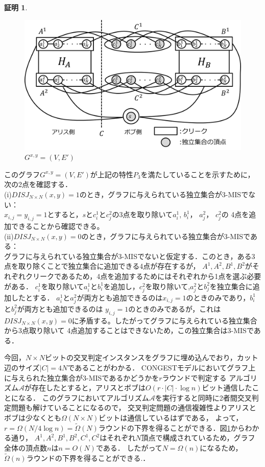 \documentclass[12pt]{thesis}
\newcommand{\CONGEST}{\textsf{CONGEST}}
\theoremstyle{definition}
\newtheorem*{prf*}{証明}
\begin{document}
\begin{prf*}
\begin{figure}[ht]
\begin{center}
\includegraphics[width=120mm]{3_Gxy.png}
\end{center}
\caption{$G^{x, y} = (V, E')$}
\label{3_G(x,y)}
\end{figure}

このグラフ$G^{x, y} = (V, E')$が上記の特性$P_{3}$を満たしていることを示すために，次の2点を確認する． \\
(i)$DISJ_{N \times N} (x, y) = 1$のとき，グラフに与えられている独立集合が3-MISでない： \\
$x_{i, j} = y_{i, j} =1$とすると，$s$と$c_{i}^{1}$と$c_{j}^{2}$の3点を取り除いて$a_{i}^{1}$, $b_{i}^{1}$， $a_{j}^{2}$， $c_{j}^{2}$の
4点を追加できることから確認できる。 \\
(ii)$DISJ_{N \times N} (x, y) = 0$のとき，グラフに与えられている独立集合が3-MISである： \\ 
グラフに与えられている独立集合が3-MISでないと仮定する．このとき，ある3点を取り除くことで独立集合に追加できる4点が存在するが，
$A^{1}, A^{2}, B^{1}, B^{2}$がそれぞれクリークであるため，4点を追加するためにはそれぞれから1点を選ぶ必要がある．
$c_{i}^{1}$を取り除いて$a_{i}^{1}$と$b_{i}^{1}$を追加し，$c_{j}^{2}$を取り除いて,$a_{j}^{2}$と$b_{j}^{2}$を独立集合に追加したとする．
$a_{i}^{1}$と$a_{j}^{2}$が両方とも追加できるのは$x_{i, j} = 1$のときのみであり，$b_{i}^{1}$と$b_{j}^{2}$が両方とも追加できるのは
$y_{i, j} = 1$のときのみであるが，これは$DISJ_{N \times N} (x, y) = 0$に矛盾する。したがってグラフに与えられている独立集合から3点取り除いて
4点追加することはできないため，この独立集合は3-MISである．

今回，$N \times N$ビットの交叉判定インスタンスをグラフに埋め込んでおり，カット辺のサイズ$|C| = 4N$であることがわかる．
{\CONGEST}モデルにおいてグラフ上に与えられた独立集合が3-MISであるかどうかを$r$ラウンドで判定する
アルゴリズム$\mathcal{A}$が存在したとすると，アリスとボブは$O(r \cdot |C| \cdot \log n)$ビット通信したことになる．
このグラフにおいてアルゴリズム$\mathcal{A}$を実行すると同時に2者間交叉判定問題も解けていることになるので，
交叉判定問題の通信複雑性よりアリスとボブは少なくとも$\Omega (N \times N)$ビットは通信しているはずである，
よって，$r = \Omega (N / 4\log n) = \tilde{\Omega}(N)$ラウンドの下界を得ることができる．図\ref{3_G(x,y)}からわかる通り，
$A^{1}, A^{2}, B^{1}, B^{2}, C^{1}, C^{2}$はそれぞれ$N$頂点で構成されているため，グラフ全体の頂点数$n$は$n = O(N)$である．
したがって$N = \Omega(n)$になるため，$\tilde{\Omega}(n)$ラウンドの下界を得ることができる.．
\end{prf*}
\newpage
\end{document}
